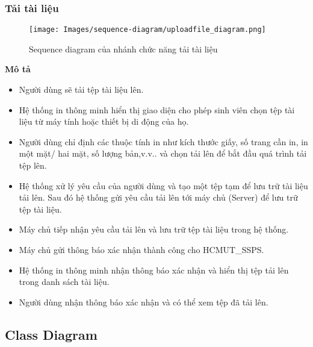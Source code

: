 \subsubsection{Tải tài liệu}
\begin{figure}[H]
    \centering
    \texttt{[image: Images/sequence-diagram/uploadfile\_diagram.png]}
    \newline
    \newline
    \caption{Sequence diagram của nhánh chức năng tải tài liệu}
    \label{fig:enter-label}
\end{figure}

\textbf{Mô tả}
\begin{itemize}
\item Người dùng sẽ tải tệp tài liệu lên.
\item Hệ thống in thông minh hiển thị giao diện cho phép sinh viên chọn tệp tài liệu từ máy tính hoặc thiết bị di động của họ.
\item  Người dùng chỉ định các thuộc tính in như kích thước giấy, số trang cần in, in một mặt/ hai mặt, số lượng bản,v.v.. và chọn tải lên để bắt đầu quá trình tải tệp lên.
\item Hệ thống xử lý yêu cầu của người dùng và tạo một tệp tạm để lưu trữ tài liệu tải lên. Sau đó hệ thống gửi yêu cầu tải lên tới máy chủ (Server) để lưu trữ tệp tài liệu.
\item Máy chủ tiếp nhận yêu cầu tải lên và lưu trữ tệp tài liệu trong hệ thống.
\item Máy chủ gửi thông báo xác nhận thành công cho HCMUT\_SSPS.
\item Hệ thống in thông minh nhận thông báo xác nhận và hiển thị tệp tải lên trong danh sách tài liệu.
\item Người dùng nhận thông báo xác nhận và có thể xem tệp đã tải lên.
\end{itemize}

\subsection{Class Diagram}
